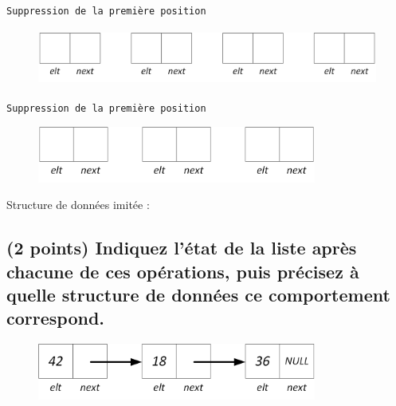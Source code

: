 \documentclass[11pt,a4paper]{article}
\begin{document}
\begin{center}
\texttt{Suppression de la première position}

\begin{figure}[ht!]
\centering
\centerline{  %
\includegraphics[height=1.85cm]{img/Liste_p_vide_4.png}
}
\end{figure}


\texttt{Suppression de la première position}

\begin{figure}[ht!]
\centering
\centerline{  %
\includegraphics[height=1.85cm]{img/Liste_p_vide_3.png}
}
\end{figure}

\bigskip

\end{center}

Structure de données imitée :



\newpage

\subsection{(2 points) Indiquez l'état de la liste après chacune de ces opérations, puis précisez à quelle structure de données ce comportement correspond. }


\begin{figure}[ht!]
\centering
\centerline{  %
\includegraphics[height=1.85cm]{img/Liste_p_1.png}
}
\end{figure}
\end{document}
